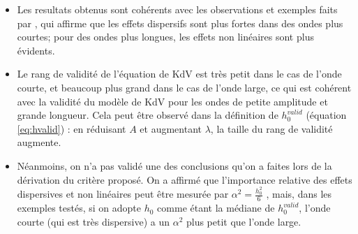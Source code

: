 \begin{itemize}
 \item Les resultats obtenus sont cohérents avec les observations et exemples faits par \cite{conservationLaws2002}, qui affirme que les effets dispersifs sont plus fortes dans des ondes plus courtes; pour des ondes plus longues, les effets non linéaires sont plus évidents.
 \item Le rang de validité de l'équation de KdV est très petit dans le cas de l'onde courte, et beaucoup plus grand dans le cas de l'onde large, ce qui est cohérent avec la validité du modèle de KdV pour les ondes de petite amplitude et grande longueur. Cela peut être observé dans la définition de $h_0^{valid}$ (équation \eqref{eq:hvalid}) : en réduisant $A$ et augmentant $\lambda$, la taille du rang de validité augmente.
 \item Néanmoins, on n'a pas validé une des conclusions qu'on a faites lors de la dérivation du critère proposé. On a affirmé que l'importance relative des effets dispersives et non linéaires peut être mesurée par $\alpha^2 = \frac{h_0^2}{6}$ , mais, dans les exemples testés, si on adopte $h_0$ comme étant la médiane de $ h_0^{valid} $, l'onde courte (qui est très dispersive) a un $\alpha^2$ plus petit que l'onde large.
\end{itemize} 
